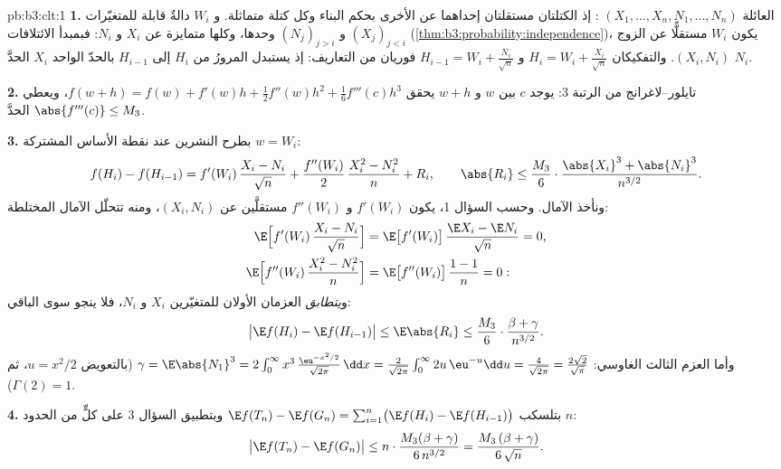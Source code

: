 \begin{solution}{pb:b3:clt:1}
\textbf{1.} العائلة $(X_1, \dots, X_n, N_1, \dots, N_n)$ : إذ الكتلتان مستقلتان
إحداهما عن الأخرى بحكم البناء وكل كتلة  متماثلة. و $W_i$
دالةٌ قابلة  للمتغيّرات $(X_j)_{j<i}$ و $(N_j)_{j>i}$
وحدها، وكلها متمايزة عن $X_i$ و $N_i$: فبمبدأ الائتلافات
(\cref{thm:b3:probability:independence})، يكون $W_i$ مستقلًّا عن الزوج $(X_i, N_i)$.
والتفكيكان $H_i = W_i + \frac{X_i}{\sqrt n}$ و $H_{i-1} = W_i +
\frac{N_i}{\sqrt n}$ فوريان من التعاريف: إذ يستبدل
المرورُ من $H_i$ إلى $H_{i-1}$ بالحدّ الواحد $X_i$ الحدَّ
$N_i$.

\textbf{2.} تايلور--لاغرانج من الرتبة $3$: يوجد $c$ بين $w$
و $w + h$ يحقق $f(w + h) = f(w) + f'(w)h +
\frac12f''(w)h^2 + \frac16f'''(c)h^3$، ويعطي $\abs{f'''(c)}
\leq M_3$ الحدَّ.

\textbf{3.} بطرح النشرين عند نقطة الأساس المشتركة $w = W_i$:
\[
f(H_i) - f(H_{i-1}) = f'(W_i)\,\frac{X_i - N_i}{\sqrt n} +
\frac{f''(W_i)}{2}\,\frac{X_i^2 - N_i^2}{n} + R_i,
\qquad
\abs{R_i} \leq \frac{M_3}{6}\cdot
\frac{\abs{X_i}^3 + \abs{N_i}^3}{n^{3/2}} .
\]
ونأخذ الآمال. وحسب السؤال 1، يكون $f'(W_i)$ و $f''(W_i)$
مستقلَّين عن $(X_i, N_i)$، ومنه تتحلّل الآمال المختلطة:
\begin{align*}
\E\Bigl[f'(W_i)\,\frac{X_i - N_i}{\sqrt n}\Bigr] &=
\E\bigl[f'(W_i)\bigr]\,\frac{\E X_i - \E N_i}{\sqrt n} = 0,
\\
\E\Bigl[f''(W_i)\,\frac{X_i^2 - N_i^2}{n}\Bigr] &=
\E\bigl[f''(W_i)\bigr]\,\frac{1 - 1}{n} = 0 :
\end{align*}
و\emph{يتطابق} العزمان الأولان للمتغيّرين $X_i$ و $N_i$، فلا
ينجو سوى الباقي:
\[
\bigl|\E f(H_i) - \E f(H_{i-1})\bigr| \leq \E\abs{R_i} \leq
\frac{M_3}{6}\cdot\frac{\beta + \gamma}{n^{3/2}} .
\]
وأما العزم الثالث الغاوسي: $\gamma = \E\abs{N_1}^3 =
2\int_0^\infty x^3\,\frac{\eu^{-x^2/2}}{\sqrt{2\pi}}\,\dd x
= \frac{2}{\sqrt{2\pi}}\int_0^\infty 2u\,\eu^{-u}\dd u =
\frac{4}{\sqrt{2\pi}} = \frac{2\sqrt2}{\sqrt\pi}$ (بالتعويض $u = x^2/2$، ثم
$\Gamma(2) = 1$).

\textbf{4.} بتلسكب $\E f(T_n) - \E f(G_n) =
\sum_{i=1}^n\bigl(\E f(H_i) - \E f(H_{i-1})\bigr)$ وبتطبيق السؤال 3 على كلٍّ من الحدود
$n$:
\[
\bigl|\E f(T_n) - \E f(G_n)\bigr| \leq
n \cdot \frac{M_3(\beta + \gamma)}{6\,n^{3/2}} =
\frac{M_3\,(\beta + \gamma)}{6\,\sqrt n} .
\]


\end{solution}
